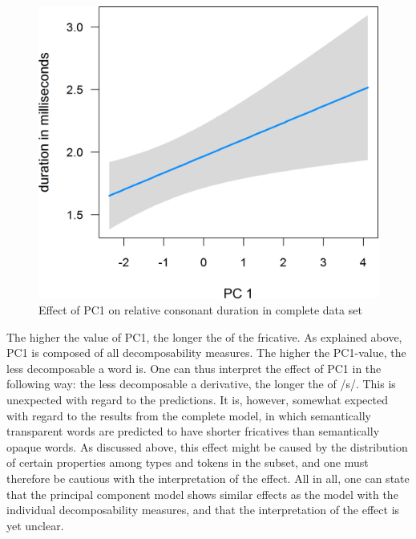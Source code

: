 \begin{figure}
	
	\includegraphics [scale=0.4] {images/Corpus/disPCAbsPC4.png}
	\caption{Effect of PC1 on relative consonant duration in complete data set}
	\label{fig:PC1 dis Corpus}
\end{figure}


The higher the value of \textsc{PC1}, the longer the  of the fricative. As explained above, \textsc{PC1} is composed of all decomposability measures. The higher the \textsc{PC1}-value, the less decomposable a word is.
 One can thus interpret the effect of \textsc{PC1} in the following way: the less decomposable a derivative, the longer the  of /s/. This is unexpected with regard to the  predictions. It is, however, somewhat expected with regard to the results from the complete  model, in which semantically transparent words are predicted to have shorter fricatives than semantically opaque words. As discussed above, this effect might be caused by the distribution of certain properties among types and tokens in the subset, and one must therefore be cautious with the interpretation of the effect. All in all, one can state that the principal component model shows similar effects as the model with the individual decomposability measures, and that the interpretation of the  effect is yet unclear.







